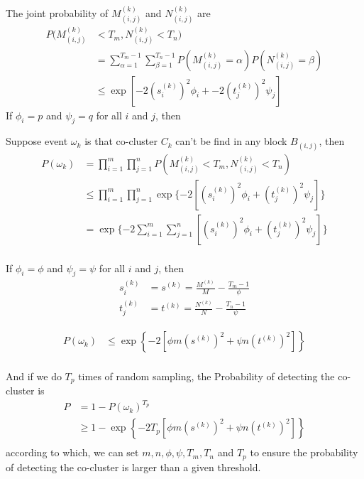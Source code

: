 \documentclass[journal]{IEEEtran}
\begin{document}
The joint probability of $M_{(i,j)}^{(k)}$ and $N_{(i,j)}^{(k)}$ are
\begin{align*}
  P(M_{(i,j)}^{(k)} &< T_m, N_{(i,j)}^{(k)} < T_n) \\ & =  \sum_{\alpha=1}^{T_m-1} \sum_{\beta=1}^{T_n-1} P(M_{(i,j)}^{(k)} = \alpha) P(N_{(i,j)}^{(k)} = \beta) \\
                                                  & \le \exp[-2 (s_i^{(k)})^2 \phi_i + -2 (t_j^{(k)})^2 \psi_j]
\end{align*}
If $\phi_i = p$ and $\psi_j = q$ for all $i$ and $j$, then

Suppose event $\omega_k$ is that co-cluster $C_k$ can't be find in any block $B_{(i,j)}$, then
\begin{align*}
  P(\omega_k) & = \prod_{i=1}^m \prod_{j=1}^n P(M_{(i,j)}^{(k)} < T_m, N_{(i,j)}^{(k)} < T_n)                          \\
              & \le \prod_{i=1}^m \prod_{j=1}^n \exp\{-2 \left[ (s_i^{(k)})^2 \phi_i + (t_j^{(k)})^2 \psi_j \right] \} \\
              & = \exp\{-2 \sum_{i=1}^m \sum_{j=1}^n \left[ (s_i^{(k)})^2 \phi_i + (t_j^{(k)})^2 \psi_j \right] \}     \\
\end{align*}

If $\phi_i = \phi$ and $\psi_j = \psi$ for all $i$ and $j$, then
\begin{align*}
  s_i^{(k)} & = s^{(k)} = \frac{M^{(k)}}{M}-\frac{T_m-1}{\phi} \\
  t_j^{(k)} & = t^{(k)} = \frac{N^{(k)}}{N}-\frac{T_n-1}{\psi}
\end{align*}

\begin{align*}
  P(\omega_k) & \le \exp \left\{ -2 [\phi m (s^{(k)})^2 + \psi n (t^{(k)})^2] \right\} \\
\end{align*}


And if we do $T_p$ times of random sampling, the Probability of detecting the co-cluster is
\begin{align*}
  P & = 1 - P(\omega_k)^{T_p}                                                        \\
    & \ge 1 - \exp \left\{ -2 T_p [\phi m (s^{(k)})^2 + \psi n (t^{(k)})^2] \right\} \\
\end{align*}
according to which, we can set $m, n, \phi, \psi, T_m, T_n$ and $T_p$ to ensure the probability of detecting the co-cluster is larger than a given threshold.
\end{document}
